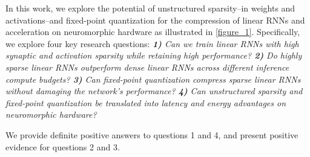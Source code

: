 In this work, we explore the potential of unstructured sparsity--in weights and activations--and fixed-point quantization for the compression of linear RNNs and acceleration on neuromorphic hardware as illustrated in \autoref{figure_1}.
Specifically, we explore four key research questions:
\textit{
\textbf{1)} Can we train linear RNNs with high synaptic and activation sparsity while retaining high performance?
\textbf{2)} Do highly sparse linear RNNs outperform dense linear RNNs across different inference compute budgets?
\textbf{3)} Can fixed-point quantization compress sparse linear RNNs without damaging the network's performance?
\textbf{4)} Can unstructured sparsity and fixed-point quantization be translated into latency and energy advantages on neuromorphic hardware?
}

We provide definite positive answers to questions \qty{1}{} and \qty{4}{}, and present positive evidence for questions \qty{2}{} and \qty{3}{}.
